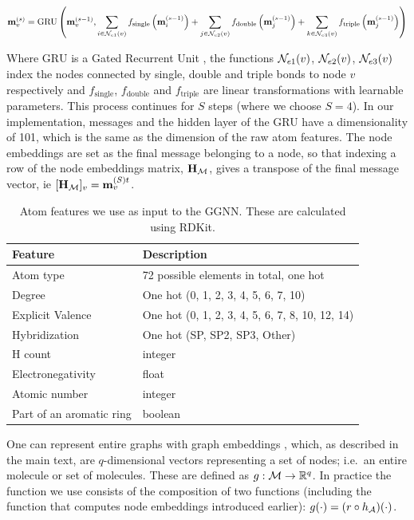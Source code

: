 \begin{align}
	{\mathbf{m}}_v^{(s)} = \textrm{GRU}\left( 
					{\mathbf{m}}_v^{(s - 1)},  
						\sum_{i \in \mathcal{N}_{e1}(v)} f_\textrm{single}\left({\mathbf{m}}_i^{(s - 1)}\right) +
						\sum_{j \in \mathcal{N}_{e2}(v)} f_\textrm{double}\left({\mathbf{m}}_j^{(s - 1)}\right) +
						\sum_{k \in \mathcal{N}_{e3}(v)} f_\textrm{triple}\left({\mathbf{m}}_j^{(s - 1)}\right)
					\right)
\end{align}

Where $\textrm{GRU}$ is a Gated Recurrent Unit \citep{Cho2014-xt}, the functions $\mathcal{N}_{e1}(v)$, $\mathcal{N}_{e2}(v)$, $\mathcal{N}_{e3}(v)$ index the nodes connected by single, double and triple bonds to node $v$ respectively and $f_\textrm{single}$, $f_\textrm{double}$ and $f_\textrm{triple}$ are linear transformations with learnable parameters.
This process continues for $S$ steps (where we choose $S=4$). In our implementation, messages and the hidden layer of the GRU have a dimensionality of 101, which is the same as the dimension of the raw atom features.
The node embeddings are set as the final message belonging to a node, so that indexing a row of the node embeddings matrix, ${\mathbf{H}}_{{\mathcal{M}}}$, gives a transpose of the final message vector, ie $[{\mathbf{H}}_{{\mathcal{M}}}]_v = {\mathbf{m}}_v^{(S)t}$.

\begin{table}
  \caption{Atom features we use as input to the GGNN. These are calculated using RDKit.}
  \label{table:atom-features}
  \centering
  \begin{tabular}{ll}
    \toprule
    Feature     & Description      \\
    \midrule
    Atom type & 72 possible elements in total, one hot  \\
    Degree     & One hot (0,   1,   2,   3,   4,   5,   6,   7,  10)  \\
    Explicit Valence     & One hot   (0,   1,   2,   3,   4,   5,   6,   7,   8,  10,  12,  14)    \\
    Hybridization & One hot (SP, SP2, SP3, Other) \\
    H count & integer \\
    Electronegativity & float \\
    Atomic number & integer \\
    Part of an aromatic ring & boolean\\
    \bottomrule
  \end{tabular}
\end{table}


One can represent entire graphs with graph embeddings \citep{li2018learning,Johnson2017-pd}, which, as described in the main text, are $q$-dimensional vectors representing a set of nodes; i.e.\ an entire molecule or set of molecules.
These are defined as $g: {\mathcal{M}} \to \mathbb{R}^{q}$. 
In practice the function we use consists of the composition of two functions (including the function that computes node embeddings introduced earlier): $g(\cdot) = (r \circ h_{{\mathcal{A}}})(\cdot)$.


